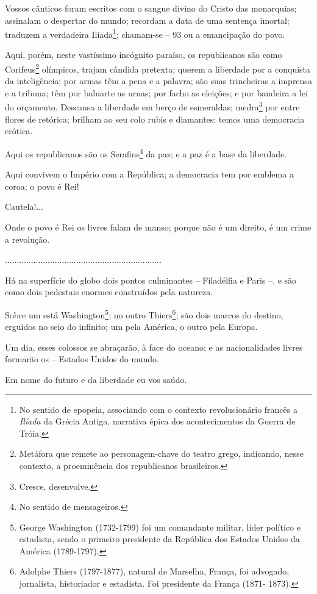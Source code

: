 Vossos cânticos foram escritos com o sangue divino do Cristo das
monarquias; assinalam o despertar do mundo; recordam a data de uma
sentença imortal; traduzem a verdadeira Ilíada\footnote{No sentido de
  epopeia, associando com o contexto revolucionário francês a
  \emph{Ilíada} da Grécia Antiga, narrativa épica dos acontecimentos da
  Guerra de Tróia.}; chamam-se -- 93 ou a emancipação do povo.

Aqui, porém, neste vastíssimo incógnito paraíso, os republicanos são
como Corifeus\footnote{Metáfora que remete ao personagem-chave do teatro
  grego, indicando, nesse contexto, a proeminência dos republicanos
  brasileiros.} olímpicos, trajam cândida pretexta; querem a liberdade
por a conquista da inteligência; por armas têm a pena e a palavra; são
suas trincheiras a imprensa e a tribuna; têm por baluarte as urnas; por
facho as eleições; e por bandeira a lei do orçamento. Descansa a
liberdade em berço de esmeraldas; medra\footnote{Cresce, desenvolve.}
por entre flores de retórica; brilham ao seu colo rubis e diamantes:
temos uma democracia erótica.

Aqui os republicanos são os Serafins\footnote{No sentido de mensageiros.}
da paz; e a paz é a base da liberdade.

Aqui convivem o Império com a República; a democracia tem por emblema a
coroa; o povo é Rei!

Cautela!...

Onde o povo é Rei os livres falam de manso; porque não é um direito, é
um crime a revolução.

..................................................................

Há na superfície do globo dois pontos culminantes -- Filadélfia e Paris
--, e são como dois pedestais enormes construídos pela natureza.

Sobre um está Washington\footnote{George Washington (1732-1799) foi um
  comandante militar, líder político e estadista, sendo o primeiro
  presidente da República dos Estados Unidos da América (1789-1797).};
no outro Thiers\footnote{Adolphe Thiers (1797-1877), natural de
  Marselha, França, foi advogado, jornalista, historiador e estadista.
  Foi presidente da França (1871- 1873).}; são dois marcos do destino,
erguidos no seio do infinito; um pela América, o outro pela Europa.

Um dia, esses colossos se abraçarão, à face do oceano; e as
nacionalidades livres formarão os -- Estados Unidos do mundo.

Em nome do futuro e da liberdade eu vos saúdo.

